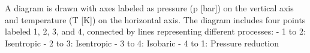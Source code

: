 A diagram is drawn with axes labeled as pressure (p [bar]) on the vertical axis and temperature (T [K]) on the horizontal axis. The diagram includes four points labeled 1, 2, 3, and 4, connected by lines representing different processes:  
- 1 to 2: Isentropic  
- 2 to 3: Isentropic  
- 3 to 4: Isobaric  
- 4 to 1: Pressure reduction